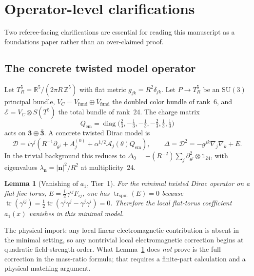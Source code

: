 \documentclass[11pt,a4paper]{article}
\newtheorem{lemma}[theorem]{Lemma}
\theoremstyle{definition}
\theoremstyle{remark}
\begin{document}
\section{Operator-level clarifications}
\label{sec:operator}

Two referee-facing clarifications are essential for reading this
manuscript as a foundations paper rather than an over-claimed proof.

\subsection{The concrete twisted model operator}

Let $T^5_R=\mathbb{R}^5/(2\pi R\,\mathbb{Z}^5)$ with flat metric
$g_{jk}=R^2\delta_{jk}$.  Let $P\to T^5_R$ be an $\mathrm{SU}(3)$
principal bundle, $V_C=V_{\mathrm{fund}}\oplus\overline{V}_{\mathrm{fund}}$
the doubled color bundle of rank~6, and $\mathcal{E}=V_C\otimes S(T^5)$
the total bundle of rank~24.  The charge matrix
\[
  Q_{\mathrm{em}}=\operatorname{diag}\!\bigl(\tfrac23,-\tfrac13,-\tfrac13,
  -\tfrac23,\tfrac13,\tfrac13\bigr)
\]
acts on $\mathbf{3}\oplus\bar{\mathbf{3}}$.  A concrete twisted Dirac
model is
\[
  \mathcal{D}=i\gamma^j\!\left(R^{-1}\partial_{\theta^j}
  +A_j^{(0)}+\alpha^{1/2}\mathcal{A}_j(\theta)Q_{\mathrm{em}}\right),
  \qquad \Delta=\mathcal{D}^2=-g^{jk}\nabla_j\nabla_k+E.
\]
In the trivial background this reduces to
$\Delta_0=-(R^{-2})\sum_j\partial_{\theta^j}^2\otimes\mathbb{1}_{24}$,
with eigenvalues $\lambda_{\mathbf{n}}=|\mathbf{n}|^2/R^2$ at
multiplicity~24.

\begin{lemma}[Vanishing of $a_1$, Tier~1]\label{lem:a1}
For the minimal twisted Dirac operator on a flat five-torus,
$E=\tfrac{i}{2}\gamma^{ij}F_{ij}$, one has
$\operatorname{tr}_{\mathrm{spin}}(E)=0$ because
$\operatorname{tr}(\gamma^{ij})=\tfrac12\operatorname{tr}(\gamma^i\gamma^j-\gamma^j\gamma^i)=0$.
Therefore the local flat-torus coefficient $a_1(x)$ vanishes in this
minimal model.
\end{lemma}

The physical import: any local linear electromagnetic contribution is
absent in the minimal setting, so any nontrivial local electromagnetic
correction begins at quadratic field-strength order.  What
Lemma~\ref{lem:a1} does \emph{not} prove is the full correction in the
mass-ratio formula; that requires a finite-part calculation and a
physical matching argument.
\end{document}
